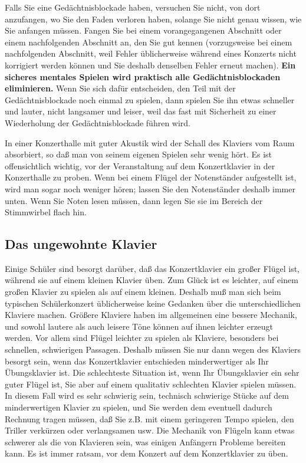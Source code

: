 Falls Sie eine Gedächtnisblockade haben, versuchen Sie nicht, von dort anzufangen, wo Sie den Faden verloren haben, solange Sie nicht genau wissen, wie Sie anfangen müssen.
Fangen Sie bei einem vorangegangenen Abschnitt oder einem nachfolgenden Abschnitt an, den Sie gut kennen (vorzugsweise bei einem nachfolgenden Abschnitt, weil Fehler üblicherweise während eines Konzerts nicht korrigiert werden können und Sie deshalb denselben Fehler erneut machen).
\textbf{Ein sicheres mentales Spielen wird praktisch alle Gedächtnisblockaden eliminieren.}
Wenn Sie sich dafür entscheiden, den Teil mit der Gedächtnisblockade noch einmal zu spielen, dann spielen Sie ihn etwas schneller und lauter, nicht langsamer und leiser, weil das fast mit Sicherheit zu einer Wiederholung der Gedächtnisblockade führen wird.

In einer Konzerthalle mit guter Akustik wird der Schall des Klaviers vom Raum absorbiert, so daß man von seinem eigenen Spielen sehr wenig hört.
Es ist offensichtlich wichtig, vor der Veranstaltung auf dem Konzertklavier in der Konzerthalle zu proben.
Wenn bei einem Flügel der Notenständer aufgestellt ist, wird man sogar noch weniger hören; lassen Sie den Notenständer deshalb immer unten.
Wenn Sie Noten lesen müssen, dann legen Sie sie im Bereich der Stimmwirbel flach hin.


\subsection{Das ungewohnte Klavier}
\label{c1iii14h} 

Einige Schüler sind besorgt darüber, daß das Konzertklavier ein großer Flügel ist, während sie auf einem kleinen Klavier üben.
Zum Glück ist es leichter, auf einem großen Klavier zu spielen als auf einem kleinen.
Deshalb muß man sich beim typischen Schülerkonzert üblicherweise keine Gedanken über die unterschiedlichen Klaviere machen.
Größere Klaviere haben im allgemeinen eine bessere Mechanik, und sowohl lautere als auch leisere Töne können auf ihnen leichter erzeugt werden.
Vor allem sind Flügel leichter zu spielen als Klaviere, besonders bei schnellen, schwierigen Passagen.
Deshalb müssen Sie nur dann wegen des Klaviers besorgt sein, wenn das Konzertklavier entschieden minderwertiger als Ihr Übungsklavier ist.
Die schlechteste Situation ist, wenn Ihr Übungsklavier ein sehr guter Flügel ist, Sie aber auf einem qualitativ schlechten Klavier spielen müssen.
In diesem Fall wird es sehr schwierig sein, technisch schwierige Stücke auf dem minderwertigen Klavier zu spielen, und Sie werden dem eventuell dadurch Rechnung tragen müssen, daß Sie z.B. mit einem geringeren Tempo spielen, den Triller verkürzen oder verlangsamen usw.
Die Mechanik von Flügeln kann etwas schwerer als die von Klavieren sein, was einigen Anfängern Probleme bereiten kann.
Es ist immer ratsam, vor dem Konzert auf dem Konzertklavier zu üben.


